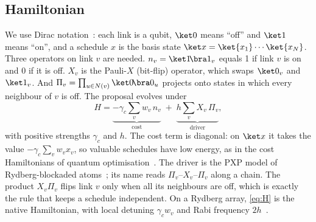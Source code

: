 \documentclass[11pt,a4paper]{article}
\begin{document}
\subsection{Hamiltonian}
We use Dirac notation~\cite{nielsen2010quantum}: each link is a qubit, $\ket0$ means ``off'' and
$\ket1$ means ``on'', and a schedule $x$ is the basis state $\ket x=\ket{x_1}\cdots\ket{x_N}$. Three
operators on link $v$ are needed. $n_v=\ket1\!\bra1_v$ equals 1 if link $v$ is on and 0 if it is off.
$X_v$ is the Pauli-$X$ (bit-flip) operator, which swaps $\ket0_v$ and $\ket1_v$. And
$\Pi_v=\prod_{u\in N(v)}\ket0\!\bra0_u$ projects onto states in which every neighbour of $v$ is off.
The proposal evolves under
\begin{equation}\label{eq:H}
H=\underbrace{-\gamma_c\sum_vw_v\,n_v}_{\text{cost}}\;+\;\underbrace{h\sum_vX_v\,\Pi_v}_{\text{driver}} ,
\end{equation}
with positive strengths $\gamma_c$ and $h$. The cost term is diagonal: on $\ket x$ it takes the value
$-\gamma_c\sum_vw_vx_v$, so valuable schedules have low energy, as in the cost Hamiltonians of
quantum optimisation~\cite{farhi2014quantum,lucas2014ising}. The driver is the PXP model of
Rydberg-blockaded atoms~\cite{fendley2004competing,lesanovsky2012interacting,turner2018weak}; its name
reads $\Pi_v$--$X_v$--$\Pi_v$ along a chain. The product $X_v\Pi_v$ flips link $v$ only when all its
neighbours are off, which is exactly the rule that keeps a schedule independent. On a Rydberg array,
\eqref{eq:H} is the native Hamiltonian, with local detuning $\gamma_cw_v$ and Rabi frequency
$2h$~\cite{bernien2017probing,pichler2018quantum}.
\end{document}

